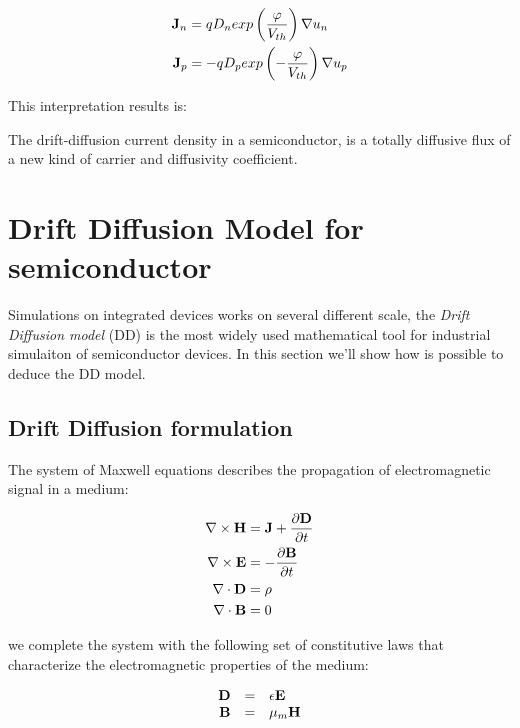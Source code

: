 \begin{align}
\mathbf{J}_n &= qD_n exp\left(\dfrac{\varphi}{V_{th}}\right) \nabla u_n \label{eq: Jn slotboom} \\
\mathbf{J}_p &= -qD_p exp\left(-\dfrac{\varphi}{V_{th}}\right)  \nabla u_p \label{eq: Jp slotboom}
\end{align}

This interpretation results is:
\begin{Osservazione}
The drift-diffusion current density in a semiconductor, is a totally diffusive flux of a new kind of carrier and diffusivity coefficient. 
\end{Osservazione}


\section{Drift Diffusion Model for semiconductor}
\label{section: dd model for semi}

Simulations on integrated devices works on several different scale, the \textit{Drift Diffusion model} (DD) is the most widely used mathematical tool for industrial simulaiton of semiconductor devices. In this section we'll show how is possible to deduce the DD model.

\subsection{Drift Diffusion formulation}
 The system of Maxwell equations describes the propagation of electromagnetic signal in a medium:

\begin{align}
\nabla \times \mathbf{H} & =  \mathbf{J} + \dfrac{\partial \mathbf{D}}{\partial t} \label{eq: magnetic equation} \\ 
\nabla \times \mathbf{E} & =  - \dfrac{\partial \mathbf{B}}{\partial t} \label{eq: ampere law}\\ 
\nabla \cdot \mathbf{D} & =  \rho \label{eq: gauss law}\\ 
\nabla \cdot \mathbf{B} &  =  0 \label{eq: no magetic charge law}
\end{align}

we complete the system with the following set of constitutive laws that characterize the electromagnetic properties of the medium:

\begin{equation}
\begin{array}{rcl}
\mathbf{D} & = & \epsilon \mathbf{E} \\
\mathbf{B} & = & \mu_m \mathbf{H} \label{eq: magnetic costitutive}
\end{array}
\end{equation}

